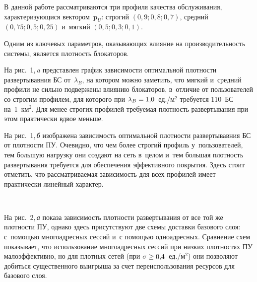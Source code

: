 \begin{multicols}{2}
  \renewcommand{\figurename}{\protect\bf Рис.}
\renewcommand{\tablename}{\protect\bf Таблица}
  
  
  В данной работе рассматриваются три профиля качества обслуживания, 
характеризующися вектором~$\mathbf{p}_U$: строгий $(0{,}9; 0{,}8; 0{,}7)$, 
средний $(0{,}75; 0{,}5; 0{,}25)$ и~мягкий $(0{,}5; 0{,}3; 0{,}1)$.
  
  Одним из ключевых параметров, оказывающих влияние на 
производительность системы, является плот\-ность блокаторов. 

На 
рис.~1,\,\textit{a} представлен график зависимости оптимальной плотности 
развертывавния БС от~$\lambda_B$, на котором можно заметить, что мягкий 
и~средний профили не сильно подвержены влиянию блокаторов, в~отличие от 
пользователей со строгим профилем, для которого при $\lambda_B\hm= 
1{,}0$~ед./м$^2$ требуется 110~БС на~1~км$^2$. Для менее строгих профилей 
требуемая плотность развертывания при этом практически вдвое меньше.
  

  На рис.~1,\,\textit{б} изображена зависимость оптимальной плотности 
развертывавния БС от плотности ПУ. Очевидно, что чем более строгий профиль 
у~пользователей, тем большую нагрузку они создают на сеть в~целом и~тем 
большая плотность развертывания требуется для обеспечения эффективного 
покрытия. Здесь стоит отметить, что рассматриваемая зависимость для всех 
профилей имеет практически линейный характер.

\setcounter{figure}{1}
\begin{figure*} %
\vspace*{1pt}
  \begin{center}  
    \mbox{%
\epsfxsize=163mm
}
\end{center}
\vspace*{-9pt}
  \end{figure*}
  
  На рис.~2,\,\textit{а} показа зависимость плотности развертывания от все той 
же плотности ПУ, однако здесь присутствуют две схемы доставки базового 
слоя: с~по\-мощью многоадресных сессий и~с помощью одноадресных. 
Сравнение схем показывает, что использование многоадресных сессий при 
низких плотностях ПУ малоэффективно, но для плотных сетей (при $\sigma\hm 
\geq 0{,}4$~ед./м$^2$) они позволяют добиться существенного выигрыша за 
счет переиспользования ресурсов для базового слоя.
  

\end{multicols}
